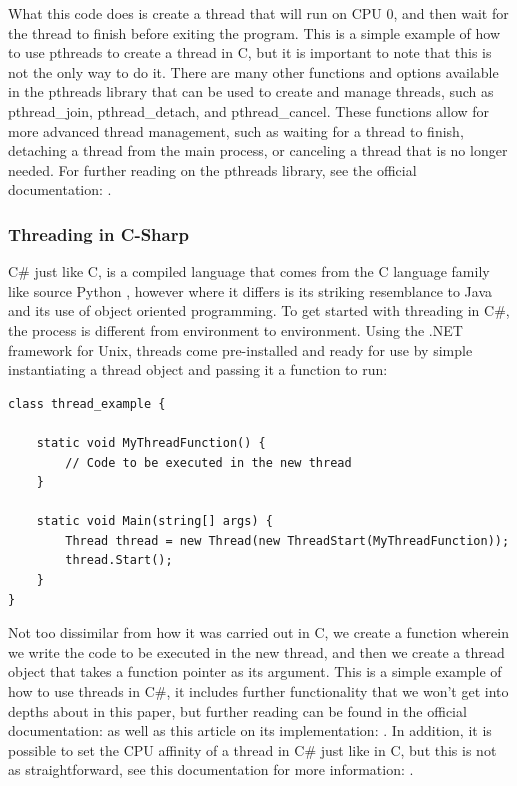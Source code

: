 \documentclass[12pt,a4paper]{article}
\begin{document}
What this code does is create a thread that will run on CPU 0, and then wait for the thread to finish before exiting the program. This is a simple example of how to use pthreads to create a thread in C, but it is important to note that this is not the only way to do it. There are many other functions and options available in the pthreads library that can be used to create and manage threads, such as pthread\_join, pthread\_detach, and pthread\_cancel. These functions allow for more advanced thread management, such as waiting for a thread to finish, detaching a thread from the main process, or canceling a thread that is no longer needed. For further reading on the pthreads library, see the official documentation: .

\subsubsection{Threading in C-Sharp}

C\# just like C, is a compiled language that comes from the C language family like source Python \parencite{PythonFAQ}, however where it differs is its striking resemblance to Java and its use of object oriented programming. To get started with threading in C\#, the process is different from environment to environment. Using the .NET framework for Unix, threads come pre-installed and ready for use by simple instantiating a thread object and passing it a function to run:

\begin{verbatim}
class thread_example {

    static void MyThreadFunction() {
        // Code to be executed in the new thread
    }

    static void Main(string[] args) {
        Thread thread = new Thread(new ThreadStart(MyThreadFunction));
        thread.Start();
    }
}
\end{verbatim}

Not too dissimilar from how it was carried out in C, we create a function wherein we write the code to be executed in the new thread, and then we create a thread object that takes a function pointer as its argument. This is a simple example of how to use threads in C\#, it includes further functionality that we won't get into depths about in this paper, but further reading can be found in the official documentation:  as well as this article on its implementation: . In addition, it is possible to set the CPU affinity of a thread in C\# just like in C, but this is not as straightforward, see this documentation for more information: \parencite{CSProcessorAffinity}.
\end{document}
